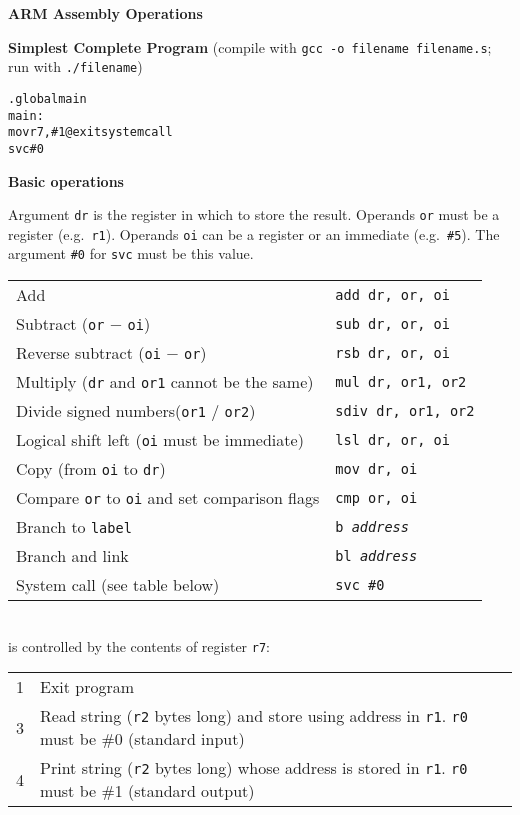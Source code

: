 \documentclass{article}
\begin{document}
\begin{center}
{\LARGE {\bf ARM Assembly Operations}}
\end{center}

\vspace{1em}
\noindent
\textbf{Simplest Complete Program}
(compile with {\tt gcc -o filename filename.s}; run with {\tt ./filename})
\begin{alltt}
    .global main
    main:
        mov r7, \#1           @exit system call
        svc \#0
\end{alltt}

\vspace{1em}
\noindent
\textbf{Basic operations}

Argument {\tt dr} is the register in which to store the result.
Operands {\tt or} must be a register (e.g.\ {\tt r1}).
Operands {\tt oi} can be a register or an immediate (e.g.\ {\tt \#5}).
The argument {\tt \#0} for {\tt svc} must be this value.

\begin{tabular}{ll}
Add & {\tt add dr, or, oi} \\
Subtract ({\tt or} $-$ {\tt oi}) & {\tt sub dr, or, oi} \\
Reverse subtract ({\tt oi} $-$ {\tt or}) & {\tt rsb dr, or, oi} \\
Multiply ({\tt dr} and {\tt or1} cannot be the same) & {\tt mul dr, or1, or2} \\
Divide signed numbers\footnotemark ({\tt or1} $/$ {\tt or2}) & {\tt sdiv dr, or1, or2} \\
Logical shift left ({\tt oi} must be immediate) & {\tt lsl dr, or, oi} \\
Copy (from {\tt oi} to {\tt dr}) & {\tt mov dr, oi} \\
Compare {\tt or} to {\tt oi} and set comparison flags \hspace{2em} & {\tt cmp or, oi} \\
Branch to {\tt label} & {\tt b {\em address}} \\
Branch and link & {\tt bl {\em address}} \\ 
System call (see table below) & {\tt svc \#0} \\
\end{tabular} \\
\hspace*{6em}{\tt svc \#0} is controlled by the contents of register {\tt r7}: \\
\hspace*{6em}\begin{tabular}{ll}
1 & Exit program \\
3 & Read string ({\tt r2} bytes long) and store using address in {\tt r1}.
  {\tt r0} must be \#0 (standard input) \\
4 & Print string ({\tt r2} bytes long) whose address is stored in {\tt r1}.
  {\tt r0} must be \#1 (standard output) \\
\end{tabular}
\end{document}
